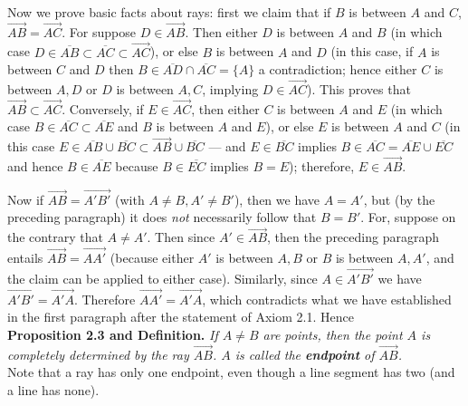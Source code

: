 \documentclass[leqno]{book}
\begin{document}
\noindent Now we prove basic facts about rays: first we claim that if $B$ is between $A$ and $C$, $\overset{\longrightarrow}{AB}=\overset{\longrightarrow}{AC}$.  For suppose $D\in\overset{\longrightarrow}{AB}$.  Then either $D$ is between $A$ and $B$ (in which case $D\in\overline{AB}\subset\overline{AC}\subset\overset{\longrightarrow}{AC}$), or else $B$ is between $A$ and $D$ (in this case, if $A$ is between $C$ and $D$ then $B\in\overline{AD}\cap\overline{AC}=\{A\}$ a contradiction; hence either $C$ is between $A,D$ or $D$ is between $A,C$, implying $D\in\overset{\longrightarrow}{AC}$).  This proves that $\overset{\longrightarrow}{AB}\subset\overset{\longrightarrow}{AC}$.  Conversely, if $E\in\overset{\longrightarrow}{AC}$, then either $C$ is between $A$ and $E$ (in which case $B\in\overline{AC}\subset\overline{AE}$ and $B$ is between $A$ and $E$), or else $E$ is between $A$ and $C$ (in this case $E\in\overline{AB}\cup\overline{BC}\subset\overset{\longrightarrow}{AB}\cup\overline{BC}$ \---- and $E\in\overline{BC}$ implies $B\in\overline{AC}=\overline{AE}\cup\overline{EC}$ and hence $B\in\overline{AE}$ because $B\in\overline{EC}$ implies $B=E$); therefore, $E\in\overset{\longrightarrow}{AB}$.

Now if $\overset{\longrightarrow}{AB}=\overset{\longrightarrow}{A'B'}$ (with $A\ne B,A'\ne B'$), then we have $A=A'$, but (by the preceding paragraph) it does \emph{not} necessarily follow that $B=B'$.  For, suppose on the contrary that $A\ne A'$.  Then since $A'\in\overset{\longrightarrow}{AB}$, then the preceding paragraph entails $\overset{\longrightarrow}{AB}=\overset{\longrightarrow}{AA'}$ (because either $A'$ is between $A,B$ or $B$ is between $A,A'$, and the claim can be applied to either case).  Similarly, since $A\in\overset{\longrightarrow}{A'B'}$ we have $\overset{\longrightarrow}{A'B'}=\overset{\longrightarrow}{A'A}$.  Therefore $\overset{\longrightarrow}{AA'}=\overset{\longrightarrow}{A'A}$, which contradicts what we have established in the first paragraph after the statement of Axiom 2.1.  Hence\\

\noindent\textbf{Proposition 2.3 and Definition.} \emph{If $A\ne B$ are points, then the point $A$ is completely determined by the ray $\overset{\longrightarrow}{AB}$.  $A$ is called the \textbf{endpoint} of $\overset{\longrightarrow}{AB}$.}\\

\noindent Note that a ray has only one endpoint, even though a line segment has two (and a line has none).\\
\end{document}
